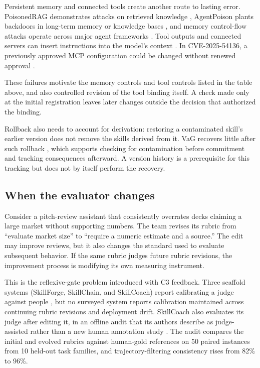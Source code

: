 \documentclass[
  11pt,
]{article}
\begin{document}
Persistent memory and connected tools create another route to lasting error. PoisonedRAG demonstrates attacks on retrieved knowledge \cite{zou2024poisonedrag}, AgentPoison plants backdoors in long-term memory or knowledge bases \cite{chen2024agentpoison}, and memory control-flow attacks operate across major agent frameworks \cite{xu2026mcfa}. Tool outputs and connected servers can insert instructions into the model's context \cite{greshake2023injection, debenedetti2024agentdojo}. In CVE-2025-54136, a previously approved MCP configuration could be changed without renewed approval \cite{checkpoint2025mcpoison}.

These failures motivate the memory controls \cite{su2026chronomem, yu2026rollbackrepair} and tool controls \cite{wallace2024hierarchy} listed in the table above, and also controlled revision of the tool binding itself. A check made only at the initial registration leaves later changes outside the decision that authorized the binding.

Rollback also needs to account for derivation: restoring a contaminated skill's earlier version does not remove the skills derived from it. VaG recovers little after such rollback \cite{shang2026vag}, which supports checking for contamination before commitment and tracking consequences afterward. A version history is a prerequisite for this tracking but does not by itself perform the recovery.

\subsection{When the evaluator changes}\label{sec:reflexive}

Consider a pitch-review assistant that consistently overrates decks claiming a large market without supporting numbers. The team revises its rubric from ``evaluate market size'' to ``require a numeric estimate and a source.'' The edit may improve reviews, but it also changes the standard used to evaluate subsequent behavior. If the same rubric judges future rubric revisions, the improvement process is modifying its own measuring instrument.

This is the reflexive-gate problem introduced with C3 feedback. Three scaffold systems (SkillForge, SkillChain, and SkillCoach) report calibrating a judge against people \cite{skillforge2026, hu2026skillchain, zhu2026skillcoach}, but no surveyed system reports calibration maintained across continuing rubric revisions and deployment drift. SkillCoach also evaluates its judge after editing it, in an offline audit that its authors describe as judge-assisted rather than a new human annotation study \cite{zhu2026skillcoach}. The audit compares the initial and evolved rubrics against human-gold references on 50 paired instances from 10 held-out task families, and trajectory-filtering consistency rises from 82\% to 96\%.
\end{document}

